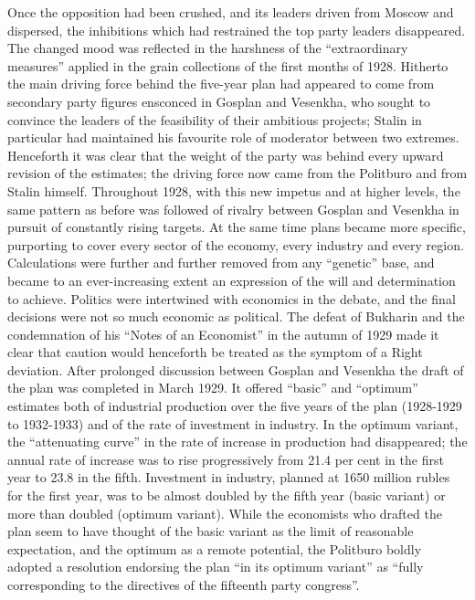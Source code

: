 Once the opposition had been crushed, and its leaders driven from Moscow and dispersed, the inhibitions which had restrained the top party leaders disappeared. The changed mood was reflected in the harshness of the ``extraordinary measures'' applied in the grain collections of the first months of 1928. Hitherto the main driving force behind the five-year plan had appeared to come from secondary party figures ensconced in Gosplan and Vesenkha, who sought to convince the leaders of the feasibility of their ambitious projects; Stalin in particular had maintained his favourite role of moderator between two extremes. Henceforth it was clear that the weight of the party was behind every upward revision of the estimates; the driving force now came from the Politburo and from Stalin himself. Throughout 1928, with this new impetus and at higher levels, the same pattern as before was followed of rivalry between Gosplan and Vesenkha in pursuit of constantly rising targets. At the same time plans became more specific, purporting to cover every sector of the economy, every industry and every region. Calculations were further and further removed from any ``genetic'' base, and became to an ever-increasing extent an expression of the will and determination to achieve. Politics were intertwined with economics in the debate, and the final decisions were not so much economic as political. The defeat of Bukharin and the condemnation of his ``Notes of an Economist'' in the autumn of 1929 made it clear that caution would henceforth be treated as the symptom of a Right deviation. After prolonged discussion between Gosplan and Vesenkha the draft of the plan was completed in March 1929. It offered ``basic'' and ``optimum'' estimates both of industrial production over the five years of the plan (1928-1929 to 1932-1933) and of the rate of investment in industry. In the optimum variant, the ``attenuating curve'' in the rate of increase in production had disappeared; the annual rate of increase was to rise progressively from 21.4 per cent in the first year to 23.8 in the fifth. Investment in industry, planned at 1650 million rubles for the first year, was to be almost doubled by the fifth year (basic variant) or more than doubled (optimum variant). While the economists who drafted the plan seem to have thought of the basic variant as the limit of reasonable expectation, and the optimum as a remote potential, the Politburo boldly adopted a resolution endorsing the plan ``in its optimum variant'' as ``fully corresponding to the directives of the fifteenth party congress''. 

